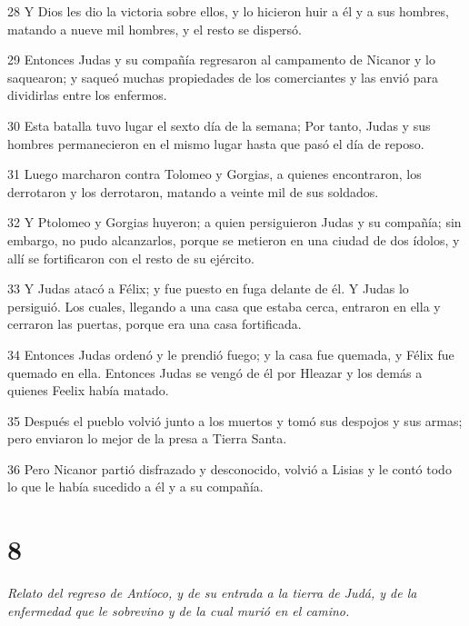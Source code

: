 \par 28 Y Dios les dio la victoria sobre ellos, y lo hicieron huir a él y a sus hombres, matando a nueve mil hombres, y el resto se dispersó.

\par 29 Entonces Judas y su compañía regresaron al campamento de Nicanor y lo saquearon; y saqueó muchas propiedades de los comerciantes y las envió para dividirlas entre los enfermos.

\par 30 Esta batalla tuvo lugar el sexto día de la semana; Por tanto, Judas y sus hombres permanecieron en el mismo lugar hasta que pasó el día de reposo.

\par 31 Luego marcharon contra Tolomeo y Gorgias, a quienes encontraron, los derrotaron y los derrotaron, matando a veinte mil de sus soldados.

\par 32 Y Ptolomeo y Gorgias huyeron; a quien persiguieron Judas y su compañía; sin embargo, no pudo alcanzarlos, porque se metieron en una ciudad de dos ídolos, y allí se fortificaron con el resto de su ejército.

\par 33 Y Judas atacó a Félix; y fue puesto en fuga delante de él. Y Judas lo persiguió. Los cuales, llegando a una casa que estaba cerca, entraron en ella y cerraron las puertas, porque era una casa fortificada.

\par 34 Entonces Judas ordenó y le prendió fuego; y la casa fue quemada, y Félix fue quemado en ella. Entonces Judas se vengó de él por Hleazar y los demás a quienes Feelix había matado.

\par 35 Después el pueblo volvió junto a los muertos y tomó sus despojos y sus armas; pero enviaron lo mejor de la presa a Tierra Santa.

\par 36 Pero Nicanor partió disfrazado y desconocido, volvió a Lisias y le contó todo lo que le había sucedido a él y a su compañía.

\chapter{8}

\par \textit{Relato del regreso de Antíoco, y de su entrada a la tierra de Judá, y de la enfermedad que le sobrevino y de la cual murió en el camino.}

